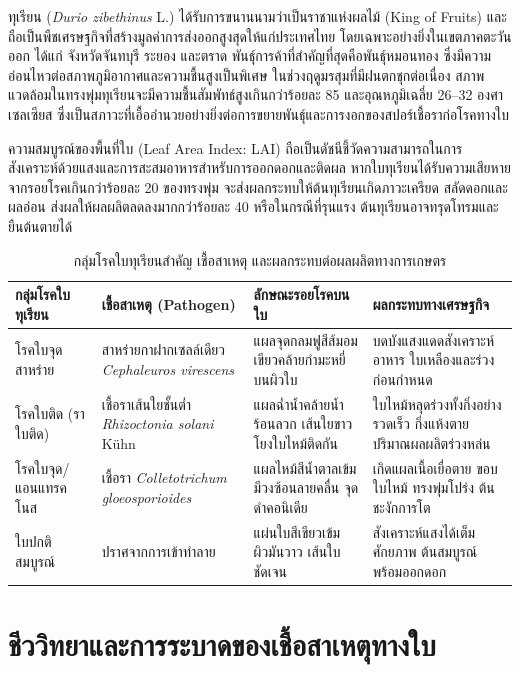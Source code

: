 ทุเรียน (\textit{Durio zibethinus} L.) ได้รับการขนานนามว่าเป็นราชาแห่งผลไม้ (King of Fruits) และถือเป็นพืชเศรษฐกิจที่สร้างมูลค่าการส่งออกสูงสุดให้แก่ประเทศไทย โดยเฉพาะอย่างยิ่งในเขตภาคตะวันออก ได้แก่ จังหวัดจันทบุรี ระยอง และตราด พันธุ์การค้าที่สำคัญที่สุดคือพันธุ์หมอนทอง ซึ่งมีความอ่อนไหวต่อสภาพภูมิอากาศและความชื้นสูงเป็นพิเศษ ในช่วงฤดูมรสุมที่มีฝนตกชุกต่อเนื่อง สภาพแวดล้อมในทรงพุ่มทุเรียนจะมีความชื้นสัมพัทธ์สูงเกินกว่าร้อยละ 85 และอุณหภูมิเฉลี่ย 26--32 องศาเซลเซียส ซึ่งเป็นสภาวะที่เอื้ออำนวยอย่างยิ่งต่อการขยายพันธุ์และการงอกของสปอร์เชื้อราก่อโรคทางใบ

ความสมบูรณ์ของพื้นที่ใบ (Leaf Area Index: LAI) ถือเป็นดัชนีชี้วัดความสามารถในการสังเคราะห์ด้วยแสงและการสะสมอาหารสำหรับการออกดอกและติดผล หากใบทุเรียนได้รับความเสียหายจากรอยโรคเกินกว่าร้อยละ 20 ของทรงพุ่ม จะส่งผลกระทบให้ต้นทุเรียนเกิดภาวะเครียด สลัดดอกและผลอ่อน ส่งผลให้ผลผลิตลดลงมากกว่าร้อยละ 40 หรือในกรณีที่รุนแรง ต้นทุเรียนอาจทรุดโทรมและยืนต้นตายได้

\begin{table}[H]
\caption{กลุ่มโรคใบทุเรียนสำคัญ เชื้อสาเหตุ และผลกระทบต่อผลผลิตทางการเกษตร}
\label{tab:ch01_diseases_overview}
\begin{tabularx}{\textwidth}{L{2.4cm}L{3.4cm}L{3.8cm}Y}
\toprule
\textbf{กลุ่มโรคใบทุเรียน} & \textbf{เชื้อสาเหตุ (Pathogen)} & \textbf{ลักษณะรอยโรคบนใบ} & \textbf{ผลกระทบทางเศรษฐกิจ} \\
\midrule
โรคใบจุดสาหร่าย & สาหร่ายกาฝากเซลล์เดียว \textit{Cephaleuros virescens} & แผลจุดกลมฟูสีส้มอมเขียวคล้ายกำมะหยี่บนผิวใบ & บดบังแสงแดดสังเคราะห์อาหาร ใบเหลืองและร่วงก่อนกำหนด \\
\addlinespace
โรคใบติด (ราใบติด) & เชื้อราเส้นใยชั้นต่ำ \textit{Rhizoctonia solani} Kühn & แผลฉ่ำน้ำคล้ายน้ำร้อนลวก เส้นใยขาวโยงใบไหม้ติดกัน & ใบไหม้หลุดร่วงทั้งกิ่งอย่างรวดเร็ว กิ่งแห้งตาย ปริมาณผลผลิตร่วงหล่น \\
\addlinespace
โรคใบจุด/แอนแทรคโนส & เชื้อรา \textit{Colletotrichum gloeosporioides} & แผลไหม้สีน้ำตาลเข้ม มีวงซ้อนลายคลื่น จุดดำคอนิเดีย & เกิดแผลเนื้อเยื่อตาย ขอบใบไหม้ ทรงพุ่มโปร่ง ต้นชะงักการโต \\
\addlinespace
ใบปกติสมบูรณ์ & ปราศจากการเข้าทำลาย & แผ่นใบสีเขียวเข้ม ผิวมันวาว เส้นใบชัดเจน & สังเคราะห์แสงได้เต็มศักยภาพ ต้นสมบูรณ์พร้อมออกดอก \\
\bottomrule
\end{tabularx}
\end{table}

\section{ชีววิทยาและการระบาดของเชื้อสาเหตุทางใบ}

